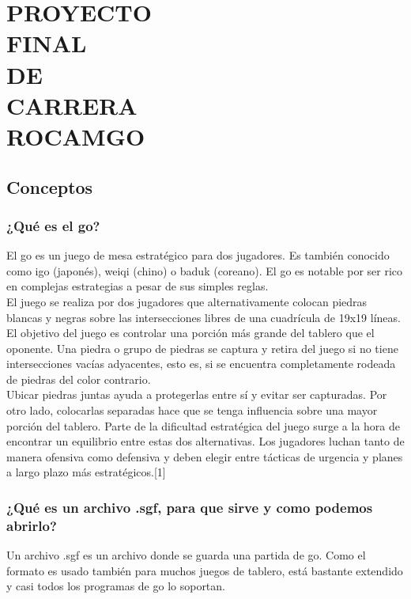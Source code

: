 \documentclass[12pt,a4paper]{report}
\author{David Medina Velasco \and Víctor Ramírez de la Corte}
\begin{document}
\part*{PROYECTO\\ FINAL\\ DE \\CARRERA \\ ROCAMGO\\}

\marginsize{3cm}{2cm}{2cm}{2cm} %

\tableofcontents  %


\chapter{Conceptos}
\section{¿Qué es el go?}
El go es un juego de mesa estratégico para dos jugadores. Es también conocido como igo (japonés), weiqi (chino) o baduk (coreano). El go es notable por ser rico en complejas estrategias a pesar de sus simples reglas. \\
El juego se realiza por dos jugadores que alternativamente colocan piedras blancas y negras sobre las intersecciones libres de una cuadrícula de 19x19 líneas. El objetivo del juego es controlar una porción más grande del tablero que el oponente. Una piedra o grupo de piedras se captura y retira del juego si no tiene intersecciones vacías adyacentes, esto es, si se encuentra completamente rodeada de piedras del color contrario.\\
Ubicar piedras juntas ayuda a protegerlas entre sí y evitar ser capturadas. Por otro lado, colocarlas separadas hace que se tenga influencia sobre una mayor porción del tablero. Parte de la dificultad estratégica del juego surge a la hora de encontrar un equilibrio entre estas dos alternativas. Los jugadores luchan tanto de manera ofensiva como defensiva y deben elegir entre tácticas de urgencia y planes a largo plazo más estratégicos.[1]





\section{¿Qué es un archivo .sgf, para que sirve y como podemos abrirlo?}\label{sgf}
Un archivo .sgf es un archivo donde se guarda una partida de go. Como el formato es usado también para muchos juegos de tablero, está bastante extendido y casi todos los programas de go lo soportan.
\end{document}
